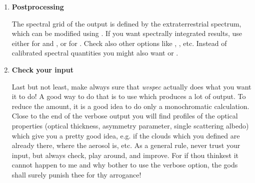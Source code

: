 \begin{enumerate}
  The RTE-solver is the engine, or heart, in any radiative transfer
  code. All RTE-solvers involve some approximations to the radiative
  transfer equations, or the solution has some uncertainties due to
  the computational demands of the solution method. The choice of
  RTE-solver depends on your problem. For example, if your
  calculations involves a low sun you should not use a plane-parallel
  solver, but one which somehow accounts for the spherical shape of
  the Earth. You may choose between many RTE-solvers in
  {\sl uvspec}. The default solution method to the radiative transfer
  is the discrete ordinate solver  which is the method
  of choice for most applications. There are other solvers like
   (faster but less accurate),
   (pseudo-spherical). Even
  lidars can be simulated using .
  
\item {\bf Postprocessing}
  
  The spectral grid of the output is defined by the extraterrestrial
  spectrum, which can be modified using .
  If you want spectrally integrated results, use either  
  for  and , 
  or  for .
  Check also other options like , ,
  etc. Instead of calibrated spectral quantities you might also want
   or .
  
\item {\bf Check your input}
  
  Last but not least, make always sure that {\sl uvspec} actually
  does what you want it to do! A good way to do that is to use
   which produces a lot of output. To reduce the amount,
  it is a good idea to do only a monochromatic calculation. Close to the
  end of the verbose output you will find profiles of the optical
  properties (optical thickness, asymmetry parameter, single scattering
  albedo) which give you a pretty good idea, e.g. if the clouds which you
  defined are already there, where the aerosol is, etc. As a general
  rule, never trust your input, but always check, play around, and
  improve. For if thou thinkest it cannot happen to me and why bother to
  use the verbose option, the gods shall surely punish thee for thy
  arrogance!
  
\end{enumerate}

